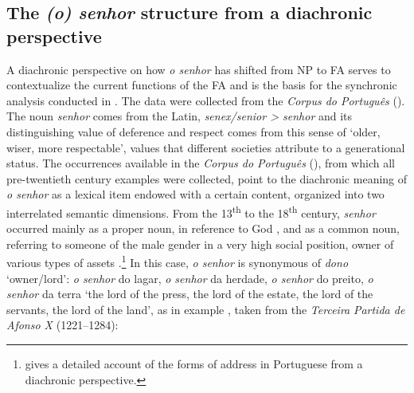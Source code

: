 \documentclass[output=paper]{langscibook}
\begin{document}
\subsection {The \textit{(o) senhor} structure from a diachronic perspective}\label{sec:marques:4.1}

A diachronic perspective on how \textit{o senhor} has shifted from NP to FA serves to contextualize the current functions of the FA and is the basis for the synchronic analysis conducted in . The data were collected from the \textit{Corpus do Português} (\citealt{DaviesFerreira2016}). The noun \textit{senhor} comes from the Latin, \textit{senex\slash senior > senhor} and its distinguishing value of deference and respect comes from this sense of ‘older, wiser, more respectable’, values that different societies attribute to a generational status. The occurrences available in the \textit{Corpus do Português} (\citealt{DaviesFerreira2016}), from which all pre-twentieth century examples were collected, point to the diachronic meaning of \textit{o senhor} as a lexical item endowed with a certain content, organized into two interrelated semantic dimensions. From the 13\textsuperscript{th} to the 18\textsuperscript{th} century, \textit{senhor} occurred mainly as a proper noun, in reference to God , and as a common noun, referring to someone of the male gender in a very high social position, owner of various types of assets .\footnote{\citet{Biderman1972} gives a detailed account of the forms of address in Portuguese from a diachronic perspective.} In this case, \textit{o senhor} is synonymous of \textit{dono} ‘owner/lord’: \textit{o senhor} do lagar, \textit{o senhor} da herdade, \textit{o senhor} do preito, \textit{o senhor} da terra ‘the lord of the press, the lord of the estate, the lord of the servants, the lord of the land’, as in example , taken from the \textit{Terceira} \textit{Partida de Afonso X} (1221–1284):
\end{document}
